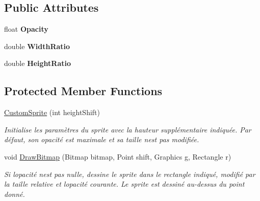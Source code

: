 \subsection*{Public Attributes}
\begin{DoxyCompactItemize}
\item 
\mbox{\label{class_tentacle_slicers_1_1graphics_1_1_custom_sprite_a885493229a16bd9ac1d2d68f4c4b489a}} 
float {\bfseries Opacity}
\item 
\mbox{\label{class_tentacle_slicers_1_1graphics_1_1_custom_sprite_ab188ab3a762a0c4c54077726f9bf4ed4}} 
double {\bfseries Width\+Ratio}
\item 
\mbox{\label{class_tentacle_slicers_1_1graphics_1_1_custom_sprite_af23e4f4f04967ca55ad8162fbd69f4c1}} 
double {\bfseries Height\+Ratio}
\end{DoxyCompactItemize}
\subsection*{Protected Member Functions}
\begin{DoxyCompactItemize}
\item 
\hyperlink{class_tentacle_slicers_1_1graphics_1_1_custom_sprite_aa82214d79a4a4a6b1ca3cd08f23e3f0d}{Custom\+Sprite} (int height\+Shift)
\begin{DoxyCompactList}\small\item\em Initialise les paramètres du sprite avec la hauteur supplémentaire indiquée. Par défaut, son opacité est maximale et sa taille n\textquotesingle{}est pas modifiée. \end{DoxyCompactList}\item 
void \hyperlink{class_tentacle_slicers_1_1graphics_1_1_custom_sprite_a2d46de1204cc9618ae7f8c93342975dc}{Draw\+Bitmap} (Bitmap bitmap, Point shift, Graphics g, Rectangle r)
\begin{DoxyCompactList}\small\item\em Si l\textquotesingle{}opacité n\textquotesingle{}est pas nulle, dessine le sprite dans le rectangle indiqué, modifié par la taille relative et l\textquotesingle{}opacité courante. Le sprite est dessiné au-\/dessus du point donné. \end{DoxyCompactList}\end{DoxyCompactItemize}
